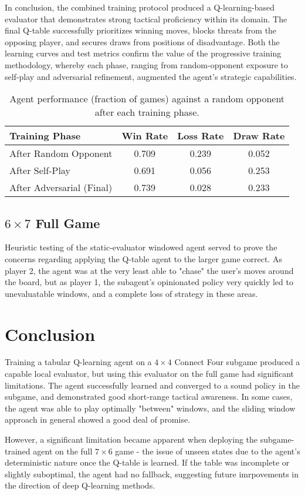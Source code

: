 \documentclass[10pt]{extarticle}
\begin{document}
In conclusion, the combined training protocol produced a Q-learning-based evaluator that demonstrates strong tactical proficiency within its domain. The final Q-table successfully prioritizes winning moves, blocks threats from the opposing player, and secures draws from positions of disadvantage. Both the learning curves and test metrics confirm the value of the progressive training methodology, whereby each phase, ranging from random-opponent exposure to self-play and adversarial refinement, augmented the agent's strategic capabilities.

\begin{table}[h!] 
	\centering 
	
	\begin{tabular}{lccc} 
		\hline Training Phase & Win Rate & Loss Rate & Draw Rate \\
		\hline After Random Opponent & 0.709 & 0.239 & 0.052 \\ 
		After Self-Play & 0.691 & 0.056 & 0.253 \\ 
		After Adversarial (Final) & 0.739 & 0.028 & 0.233 \\ 
		\hline 
	\end{tabular} 
	
	\caption{Agent performance (fraction of games) against a random opponent after each training phase.} 
\end{table}

\subsection{$6 \times 7$ Full Game}

Heuristic testing of the static-evaluator windowed agent served to prove the concerns regarding applying the Q-table agent to the larger game correct. As player 2, the agent was at the very least able to "chase" the user's moves around the board, but as player 1, the subagent's opinionated policy very quickly led to unevaluatable windows, and a complete loss of strategy in these areas.

\section{Conclusion}

Training a tabular Q-learning agent on a $4\times4$ Connect Four subgame produced a capable local evaluator, but using this evaluator on the full game had significant limitations. The agent successfully learned and converged to a sound policy in the subgame, and demonstrated good short-range tactical awareness. In some cases, the agent was able to play optimally "between" windows, and the sliding window approach in general showed a good deal of promise.

However, a significant limitation became apparent when deploying the subgame-trained agent on the full $7 \times 6$ game - the issue of unseen states due to the agent's deterministic nature once the Q-table is learned. If the table was incomplete or slightly suboptimal, the agent had no fallback, suggesting future imrpovements in the direction of deep Q-learning methods.

\pagebreak



\end{document}
